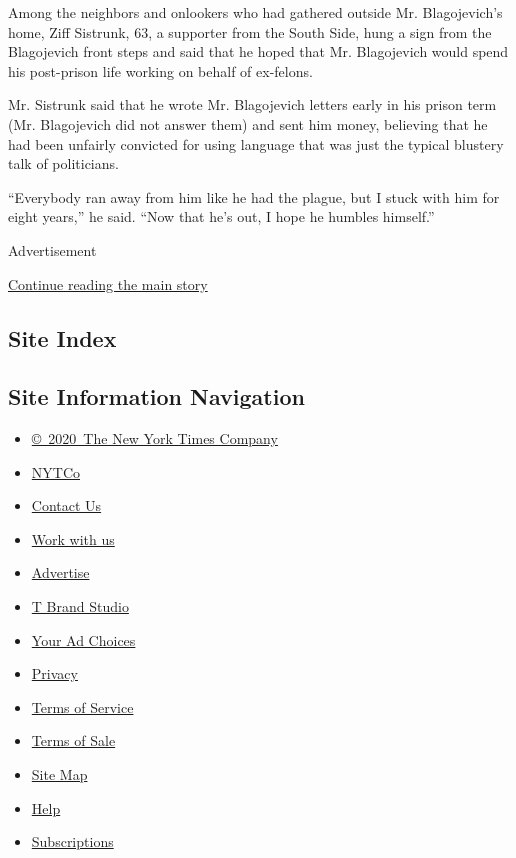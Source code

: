 Among the neighbors and onlookers who had gathered outside Mr.
Blagojevich's home, Ziff Sistrunk, 63, a supporter from the South Side,
hung a sign from the Blagojevich front steps and said that he hoped that
Mr. Blagojevich would spend his post-prison life working on behalf of
ex-felons.

Mr. Sistrunk said that he wrote Mr. Blagojevich letters early in his
prison term (Mr. Blagojevich did not answer them) and sent him money,
believing that he had been unfairly convicted for using language that
was just the typical blustery talk of politicians.

``Everybody ran away from him like he had the plague, but I stuck with
him for eight years,'' he said. ``Now that he's out, I hope he humbles
himself.''

Advertisement

\protect\hyperlink{after-bottom}{Continue reading the main story}

\hypertarget{site-index}{%
\subsection{Site Index}\label{site-index}}

\hypertarget{site-information-navigation}{%
\subsection{Site Information
Navigation}\label{site-information-navigation}}

\begin{itemize}
\tightlist
\item
  \href{https://help.nytimes.com/hc/en-us/articles/115014792127-Copyright-notice}{©~2020~The
  New York Times Company}
\end{itemize}

\begin{itemize}
\tightlist
\item
  \href{https://www.nytco.com/}{NYTCo}
\item
  \href{https://help.nytimes.com/hc/en-us/articles/115015385887-Contact-Us}{Contact
  Us}
\item
  \href{https://www.nytco.com/careers/}{Work with us}
\item
  \href{https://nytmediakit.com/}{Advertise}
\item
  \href{http://www.tbrandstudio.com/}{T Brand Studio}
\item
  \href{https://www.nytimes.com/privacy/cookie-policy\#how-do-i-manage-trackers}{Your
  Ad Choices}
\item
  \href{https://www.nytimes.com/privacy}{Privacy}
\item
  \href{https://help.nytimes.com/hc/en-us/articles/115014893428-Terms-of-service}{Terms
  of Service}
\item
  \href{https://help.nytimes.com/hc/en-us/articles/115014893968-Terms-of-sale}{Terms
  of Sale}
\item
  \href{https://spiderbites.nytimes.com}{Site Map}
\item
  \href{https://help.nytimes.com/hc/en-us}{Help}
\item
  \href{https://www.nytimes.com/subscription?campaignId=37WXW}{Subscriptions}
\end{itemize}
